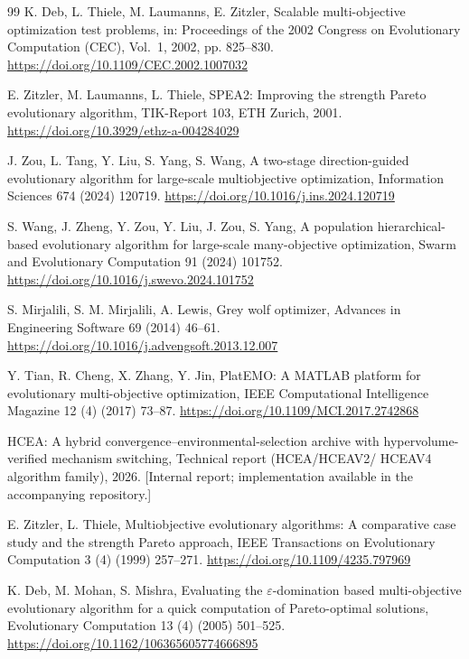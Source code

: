 \documentclass[preprint,12pt]{elsarticle}
\begin{document}
\begin{thebibliography}{99}
K. Deb, L. Thiele, M. Laumanns, E. Zitzler, Scalable multi-objective
optimization test problems, in: Proceedings of the 2002 Congress on
Evolutionary Computation (CEC), Vol.~1, 2002, pp. 825--830.
\url{https://doi.org/10.1109/CEC.2002.1007032}

E. Zitzler, M. Laumanns, L. Thiele, SPEA2: Improving the strength Pareto
evolutionary algorithm, TIK-Report 103, ETH Zurich, 2001.
\url{https://doi.org/10.3929/ethz-a-004284029}

J. Zou, L. Tang, Y. Liu, S. Yang, S. Wang, A two-stage direction-guided
evolutionary algorithm for large-scale multiobjective optimization,
Information Sciences 674 (2024) 120719.
\url{https://doi.org/10.1016/j.ins.2024.120719}

S. Wang, J. Zheng, Y. Zou, Y. Liu, J. Zou, S. Yang, A population
hierarchical-based evolutionary algorithm for large-scale many-objective
optimization, Swarm and Evolutionary Computation 91 (2024) 101752.
\url{https://doi.org/10.1016/j.swevo.2024.101752}

S. Mirjalili, S. M. Mirjalili, A. Lewis, Grey wolf optimizer, Advances in
Engineering Software 69 (2014) 46--61.
\url{https://doi.org/10.1016/j.advengsoft.2013.12.007}

Y. Tian, R. Cheng, X. Zhang, Y. Jin, PlatEMO: A MATLAB platform for
evolutionary multi-objective optimization, IEEE Computational Intelligence
Magazine 12 (4) (2017) 73--87. \url{https://doi.org/10.1109/MCI.2017.2742868}

HCEA: A hybrid convergence--environmental-selection archive with
hypervolume-verified mechanism switching, Technical report (HCEA/HCEAV2/
HCEAV4 algorithm family), 2026. [Internal report; implementation available
in the accompanying repository.]

E. Zitzler, L. Thiele, Multiobjective evolutionary algorithms: A comparative
case study and the strength Pareto approach, IEEE Transactions on
Evolutionary Computation 3 (4) (1999) 257--271.
\url{https://doi.org/10.1109/4235.797969}

K. Deb, M. Mohan, S. Mishra, Evaluating the $\varepsilon$-domination based
multi-objective evolutionary algorithm for a quick computation of
Pareto-optimal solutions, Evolutionary Computation 13 (4) (2005) 501--525.
\url{https://doi.org/10.1162/106365605774666895}


\end{thebibliography}
\end{document}
